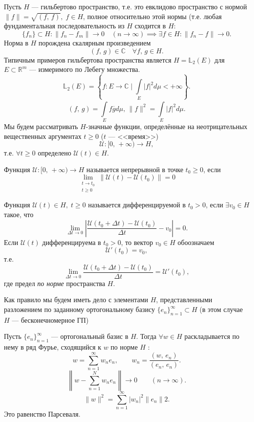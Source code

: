 \lec
Пусть $H$ --- гильбертово пространство, т.\:е. это евклидово пространство с нормой $\|f\|=\sqrt{\left( f,\,f \right) },\; f \in H$,
полное относительно этой нормы  (т.\:е. любая фундаментальная
последовательность из $H$ сходится в $H$:
\[
	\{f_n\} \subset H: \|f_n-f_m\|\to 0 \quad(n\to \infty) \implies
	\exists f \in H: \|f_n-f\|\to 0
.\] 
Норма в $H$ порождена скалярным произведением
\[
	(f,\,g) \in \mathbb{C}\quad\forall f,\,g \in H 
.\]
Типичным примеров гильбертова пространства является
$
	H=\mathbb{L}_2 (E)
$ 
для $E \subset \mathbb{R}^m$ --- измеримого по Лебегу множества.
\[
	\mathbb{L}_2(E)= \left\{ f: E\to \mathbb{C}\mid 
	\int\limits_{E}^{} |f|^2d\mu < +\infty \right\}  
.\]
\[
	\left( f,\,g \right) =\int\limits_{E}^{} f \overline{g}
	d \mu,\, \|f\|^2= \int\limits_{E}^{} |f|^2 d\mu 
.\] 
Мы будем рассматривать $H$-значные функции, определённые на
неотрицательных вещественных аргументах $t\ge 0$ ($t$ --- <<время>>)
\[
	\mathcal{U}:[0,\,+\infty)\to H,
\] 
т.\:е. $\forall t \ge 0$ определено $\mathcal{U}(t) \in H$.

Функция $\mathcal{U}: [0,\,+\infty)\to H$ называется непрерывной в точке
$t_0\ge 0$, если \[\lim_{\substack{t \to t_0 \\ t\ge 0}} \|\mathcal{U}(t)-\mathcal{U}(t_0)\|=0\]

Функция $\mathcal{U}(t) \in H,\; t\ge 0$ называется дифференцируемой в 
$t_0>0$, если $\exists v_0 \in H$ такое, что
\[
	\lim_{\Delta t \to 0} \left| \frac{\mathcal{U}(t_0+\Delta t)-
\mathcal{U}	(t_0)}{\Delta t}-v_0 \right| =0
.\] 
Если $\mathcal{U}(t)$ дифференцируема в $t_0>0$, то вектор $v_0 \in H$ 
обоозначаем
\[
	\mathcal{U}'(t_0)=v_0,
\] 
т.\:е.
 \[
	 \lim_{\Delta t \to 0} \frac{\mathcal{U}(t_0+\Delta t)-
	 \mathcal{U}(t_0)}{\Delta t}= \mathcal{U}'(t_0),
\] 
где предел \emph{по норме} пространства $H$.

Как правило мы будем иметь дело с элементами $H$, представленными
разложением по заданному ортогональному базису $\{e_n\} _{n=1}^\infty\subset H$ (в этом случае $H$ --- бесконечномерное ГП)

Пусть $\{e_n\} _{n=1}^\infty$ --- ортогональный базис в $H$.
Тогда $\forall w \in  H$ раскладывается по нему в ряд Фурье,
сходящийся к $w$ по норме $H$ :
\[
	w=\sum_{n=1}^{\infty} w_n e_n, \qquad w_n =\frac{\left( 
	w,\, e_n\right) }{\left( e_n,\,e_n \right) }
.\] 
\[
	\left\lVert w- \sum_{n=1}^{N} w_n e_n\right\rVert\to 0 \qquad (n\to \infty).
\] 
\[
\| w\|^2 = \sum_{n=1}^{\infty} |w_n|^2 \| e_n\|2
.\]
Это равенство Парсеваля.


